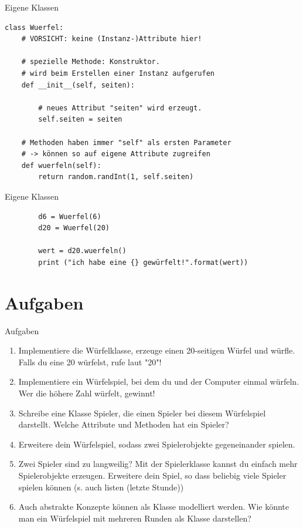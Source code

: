 \begin{frame}[fragile]{Eigene Klassen}
    \begin{lstlisting}
class Wuerfel:
    # VORSICHT: keine (Instanz-)Attribute hier!

    # spezielle Methode: Konstruktor. 
    # wird beim Erstellen einer Instanz aufgerufen
    def __init__(self, seiten):

        # neues Attribut "seiten" wird erzeugt.
        self.seiten = seiten

    # Methoden haben immer "self" als ersten Parameter
    # -> können so auf eigene Attribute zugreifen
    def wuerfeln(self):
        return random.randInt(1, self.seiten)
    \end{lstlisting}
\end{frame}

\begin{frame}[fragile]{Eigene Klassen}
    \begin{lstlisting}
        d6 = Wuerfel(6)
        d20 = Wuerfel(20)

        wert = d20.wuerfeln()
        print ("ich habe eine {} gewürfelt!".format(wert))
    \end{lstlisting}
\end{frame}


\section{Aufgaben}
\begin{frame}{Aufgaben}
    \begin{enumerate}
        \item Implementiere die Würfelklasse, erzeuge einen 20-seitigen Würfel und würfle. Falls du eine 20 würfelst, rufe laut "20"!
        \item Implementiere ein Würfelspiel, bei dem du und der Computer einmal würfeln. Wer die höhere Zahl würfelt, gewinnt!
        \item Schreibe eine Klasse \glqq Spieler\grqq, die einen Spieler bei diesem Würfelspiel darstellt. Welche Attribute und Methoden hat ein Spieler?
        \item Erweitere dein Würfelspiel, sodass zwei Spielerobjekte gegeneinander spielen.
        \item Zwei Spieler sind zu langweilig? Mit der Spielerklasse kannst du einfach mehr Spielerobjekte erzeugen. Erweitere dein Spiel, so dass beliebig viele Spieler spielen können (s. auch listen (letzte Stunde))
        \item Auch abstrakte Konzepte können als Klasse modelliert werden. Wie könnte man ein Würfelspiel mit mehreren Runden als Klasse darstellen?
    \end{enumerate}
\end{frame}


